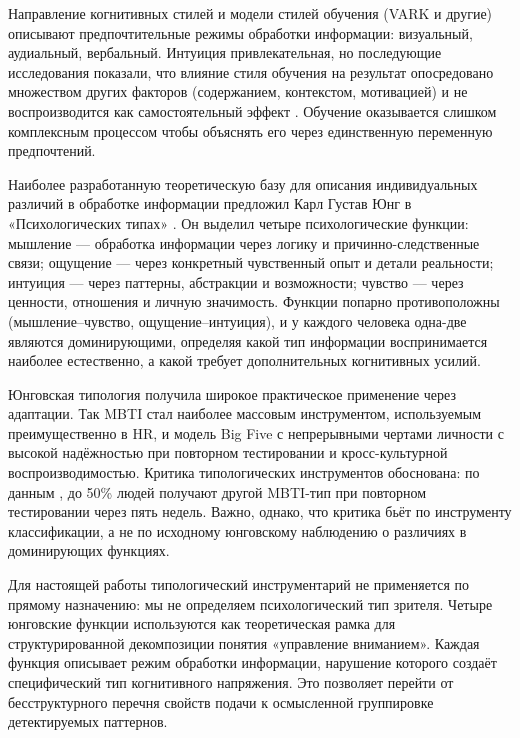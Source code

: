 Направление когнитивных стилей \textcite{riding1997cognitive} и модели стилей обучения (VARK и другие) описывают предпочтительные режимы обработки информации: визуальный,
аудиальный, вербальный. Интуиция привлекательная, но последующие исследования показали, что влияние стиля обучения на результат опосредовано множеством других факторов
(содержанием, контекстом, мотивацией) и не воспроизводится как самостоятельный эффект \cite{pashler2008learningstyles}.
Обучение оказывается слишком комплексным процессом чтобы объяснять его через единственную переменную предпочтений.

Наиболее разработанную теоретическую базу для описания индивидуальных различий в обработке информации предложил Карл Густав Юнг в «Психологических типах»
\cite{jung1921psychologischetypen}. Он выделил четыре психологические функции: мышление — обработка информации через логику и причинно-следственные связи;
ощущение — через конкретный чувственный опыт и детали реальности; интуиция — через паттерны, абстракции и возможности; чувство — через ценности, отношения и личную значимость.
Функции попарно противоположны (мышление–чувство, ощущение–интуиция), и у каждого человека одна-две являются доминирующими,
определяя какой тип информации воспринимается наиболее естественно, а какой требует дополнительных когнитивных усилий.

Юнговская типология получила широкое практическое применение через адаптации. Так MBTI \cite{myers1998mbtimanual} стал наиболее массовым инструментом,
используемым преимущественно в HR, и модель Big Five \cite{costa1992revised} с непрерывными чертами личности с высокой надёжностью при повторном тестировании
и кросс-культурной воспроизводимостью. Критика типологических инструментов обоснована: по данным \textcite{pittenger1993measuring},
до 50\% людей получают другой MBTI-тип при повторном тестировании через пять недель.
Важно, однако, что критика бьёт по инструменту классификации, а не по исходному юнговскому наблюдению о различиях в доминирующих функциях.

Для настоящей работы типологический инструментарий не применяется по прямому назначению: мы не определяем психологический тип зрителя.
Четыре юнговские функции используются как теоретическая рамка для структурированной декомпозиции понятия «управление вниманием».
Каждая функция описывает режим обработки информации, нарушение которого создаёт специфический тип когнитивного напряжения.
Это позволяет перейти от бесструктурного перечня свойств подачи к осмысленной группировке детектируемых паттернов.

